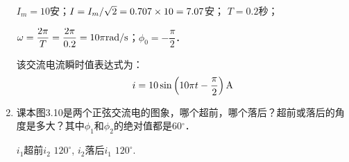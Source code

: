 \begin{enumerate}
    \begin{solution}
$I_m=10$安；$I=I_m/\sqrt{2}=0.707\times10=7.07$安；
$T=0.2$秒；

$\omega=\dfrac{2\pi}{T}=\dfrac{2\pi}{0.2}=10\pi{\rm rad/s}$；$\phi_0=-\dfrac{\pi}{2}$．

该交流电流瞬时值表达式为：
\[i=10\sin\left(10\pi t -\frac{\pi}{2}\right){\rm A}\]
    \end{solution}
    
    \item 课本图3.10是两个正弦交流电的图象，哪个超前，哪个落后？超前或落后的角度是多大？其中$\phi_1$和$\phi_2$的绝对值都是60$^\circ$．
    
\begin{solution}
$i_1$超前$i_2$ $120^{\circ}$, $i_2$落后$i_1$ $120^{\circ}$.
\end{solution}

\end{enumerate}


